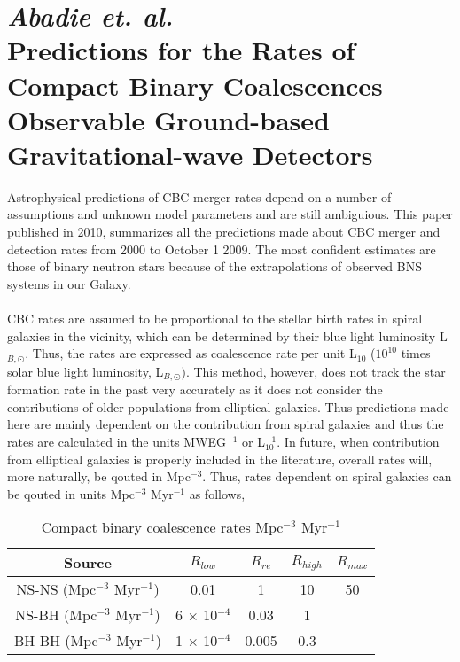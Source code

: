\documentclass{article}
\numberwithin{equation}{section}
\begin{document}
\section*{\normalsize{\textit{Abadie et. al.\\}}\small{Predictions for the Rates of Compact Binary Coalescences Observable Ground-based Gravitational-wave Detectors}}
Astrophysical predictions of CBC merger rates depend on a number of assumptions and unknown model parameters and are still ambiguious. This paper published in 2010, summarizes all the predictions made about CBC merger and detection rates from 2000 to October 1 2009. The most confident estimates are those of binary neutron stars because of the extrapolations of observed BNS systems in our Galaxy.\\
\\
CBC rates are assumed to be proportional to the stellar birth rates in spiral galaxies in the vicinity, which can be determined by their blue light luminosity L$_{B, \odot}$. Thus, the rates are expressed as coalescence rate per unit L$_{10}$ ($10^{10}$ times solar blue light luminosity, L$_{B, \odot})$. This method, however, does not track the star formation rate in the past very accurately as it does not consider the contributions of older populations from elliptical galaxies. Thus predictions made here are mainly dependent on the contribution from spiral galaxies and thus the rates are calculated in the units MWEG$^{-1}$ or L$_{10}^{-1}$. In future, when contribution from elliptical galaxies is properly included in the literature, overall rates will, more naturally, be qouted in Mpc$^{-3}$. Thus, rates dependent on spiral galaxies can be qouted in units Mpc$^{-3}$ Myr$^{-1}$ as follows,

\begin{table}[h!]
	\centering
	\caption{Compact binary coalescence rates Mpc$^{-3}$ Myr$^{-1}$}
	\label{tab:table1}
	\begin{tabular}{ccccc}
		\toprule
		Source & $R_{low}$ & $R_{re}$ & $R_{high}$ & $R_{max}$\\
		\midrule
		NS-NS (Mpc$^{-3}$ Myr$^{-1}$) & 0.01 & 1 & 10 & 50\\
		NS-BH (Mpc$^{-3}$ Myr$^{-1}$) & 6 $\times$ 10$^{-4}$ & 0.03 & 1 & \\
		BH-BH (Mpc$^{-3}$ Myr$^{-1}$) & 1 $\times$ 10$^{-4}$ & 0.005 & 0.3 & \\
		\bottomrule
	\end{tabular}
\end{table}
\end{document}
